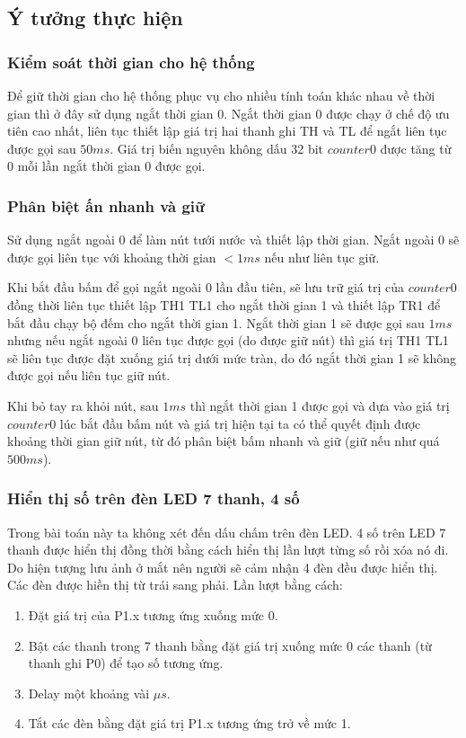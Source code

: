 \documentclass[../report.tex]{subfiles}
\begin{document}
\subsection{Ý tưởng thực hiện}
\subsubsection{Kiểm soát thời gian cho hệ thống} 
Để giữ thời gian cho hệ thống phục vụ cho nhiều tính toán khác nhau về thời gian thì ở đây sử dụng ngắt thời gian 0. 
Ngắt thời gian 0 được chạy ở chế độ ưu tiên cao nhất, liên tục thiết lập giá trị hai thanh ghi TH và TL để ngắt liên tục được gọi 
sau $50ms$. Giá trị biến nguyên không dấu 32 bit $counter0$ được tăng từ 0 mỗi lần ngắt thời gian 0 được gọi. 

\subsubsection{Phân biệt ấn nhanh và giữ} 
Sử dụng ngắt ngoài 0 để làm nút tưới nước và thiết lập thời gian. Ngắt ngoài 0 sẽ được gọi liên tục với khoảng thời gian $< 1ms$ 
nếu như liên tục giữ.

Khi bắt đầu bấm để gọi ngắt ngoài 0 lần đầu tiên, sẽ lưu trữ giá trị của $counter0$ đồng thời liên tục 
thiết lập TH1 TL1 cho ngắt thời gian 1 
và thiết lập TR1 để bắt đầu chạy bộ đếm cho ngắt thời gian 1. Ngắt thời gian 1 sẽ được gọi sau $1ms$ nhưng nếu ngắt ngoài 0 liên tục 
được gọi (do được giữ nút) thì giá trị TH1 TL1 sẽ liên tục được đặt xuống giá trị dưới mức tràn, do đó ngắt thời gian 1 sẽ không được 
gọi nếu liên tục giữ nút. 

Khi bỏ tay ra khỏi nút, sau $1ms$ thì ngắt thời gian 1 được gọi và dựa vào giá trị $counter0$ lúc bắt đầu bấm nút và giá trị hiện tại
ta có thể quyết định được khoảng thời gian giữ nút, từ đó phân biệt bấm nhanh và giữ (giữ nếu như quá $500ms$). 

\subsubsection{Hiển thị số trên đèn LED 7 thanh, 4 số} 
Trong bài toán này ta không xét đến dấu chấm trên đèn LED. 4 số trên LED 7 thanh được hiển thị đồng thời bằng cách hiển thị lần lượt từng số rồi xóa nó đi. Do hiện tượng lưu ảnh ở mắt nên người 
sẽ cảm nhận 4 đèn đều được hiển thị. 
Các đèn được hiền thị từ trái sang phải. Lần lượt bằng cách: 
\begin{enumerate}
    \item Đặt giá trị của P1.x tương ứng xuống mức 0. 
    \item Bật các thanh trong 7 thanh bằng đặt giá trị xuống mức 0 các thanh (từ thanh ghi P0) để tạo số tương ứng. 
    \item Delay một khoảng vài $\mu s$.
    \item Tắt các đèn bằng đặt giá trị P1.x tương ứng trở về mức 1. 
\end{enumerate}
\end{document}
